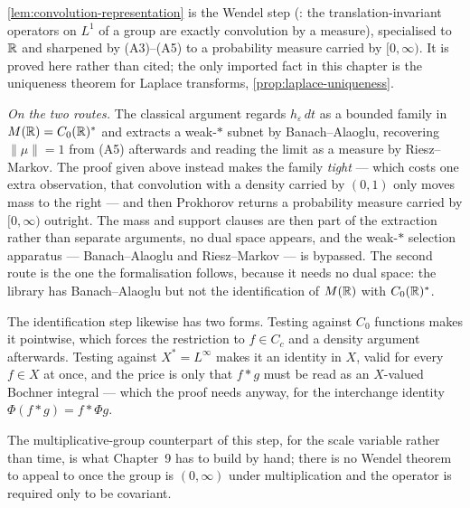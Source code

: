 \begin{remark}\label{rem:wendel}
\ref{lem:convolution-representation} is the Wendel step
(: the translation-invariant operators on $L^1$ of a group are exactly
convolution by a measure), specialised to $\mathbb{R}$ and sharpened by (A3)--(A5) to a probability
measure carried by $[0,\infty)$. It is proved here rather than cited; the only imported
fact in this chapter is the uniqueness theorem for Laplace transforms,
\ref{prop:laplace-uniqueness}.

\emph{On the two routes.} The classical argument regards $h_\varepsilon\,dt$ as a bounded
family in $M(\mathbb{R}) = C_0(\mathbb{R})^*$ and extracts a weak-$*$ subnet by Banach--Alaoglu, recovering
$\|\mu\| = 1$ from (A5) afterwards and reading the limit as a measure by Riesz--Markov. The
proof given above instead makes the family \emph{tight} --- which costs one extra observation,
that convolution with a density carried by $(0,1)$ only moves mass to the right --- and then
Prokhorov returns a probability measure carried by $[0,\infty)$ outright. The mass and support
clauses are then part of the extraction rather than separate arguments, no dual space appears,
and the weak-$*$ selection apparatus --- Banach--Alaoglu and Riesz--Markov --- is
bypassed. The second route is the one the formalisation follows, because it needs no dual
space: the library has Banach--Alaoglu but not the identification of $M(\mathbb{R})$ with
$C_0(\mathbb{R})^*$.

The identification step likewise has two forms. Testing against $C_0$ functions makes it
pointwise, which forces the restriction to $f \in C_c$ and a density argument afterwards.
Testing against $X^* = L^\infty$ makes it an identity in $X$, valid for every $f \in X$ at
once, and the price is only that $f * g$ must be read as an $X$-valued Bochner integral --- which
the proof needs anyway, for the interchange identity $\Phi(f * g) = f * \Phi g$.

The multiplicative-group counterpart of this step, for the scale variable rather than time,
is what Chapter~9 has to build by hand; there is no Wendel theorem to appeal to once the
group is $(0,\infty)$ under multiplication and the operator is required only to be covariant.
\end{remark}
